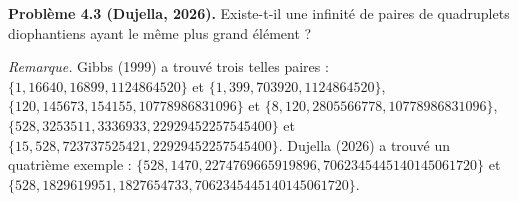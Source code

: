\textbf{Problème 4.3 (Dujella, 2026).} Existe-t-il une infinité de paires de quadruplets diophantiens ayant le même plus grand élément ?

\medskip

\textit{Remarque.} Gibbs (1999) a trouvé trois telles paires : $\{1,16640,16899,1124864520\}$ et $\{1,399,703920,1124864520\}$, $\{120,145673,154155,10778986831096\}$ et $\{8,120,2805566778,10778986831096\}$, $\{528,3253511,3336933,22929452257545400\}$ et $\{15,528,723737525421,22929452257545400\}$. Dujella (2026) a trouvé un quatrième exemple : $\{528,1470,2274769665919896,7062345445140145061720\}$ et $\{528,1829619951,1827654733,7062345445140145061720\}$.
